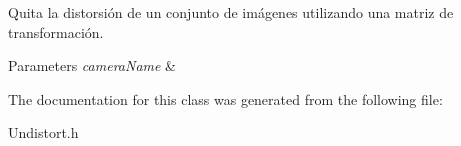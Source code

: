 Quita la distorsión de un conjunto de imágenes utilizando una matriz de transformación. 


\begin{DoxyParams}{Parameters}
{\em camera\+Name} & \\
\hline
\end{DoxyParams}


The documentation for this class was generated from the following file\+:\begin{DoxyCompactItemize}
\item 
Undistort.\+h\end{DoxyCompactItemize}

